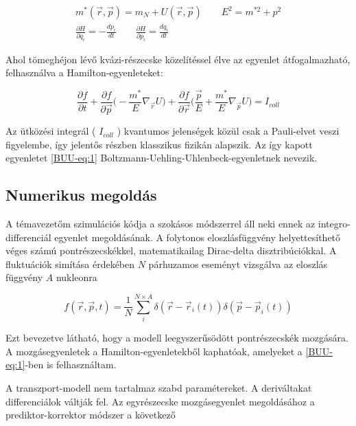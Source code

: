 \documentclass[a4paper,12pt]{article}
\begin{document}
\begin{gather}
	m^{*}(\vec{r}, \vec{p}) = m_{N} + U(\vec{r}, \vec{p}) \quad \quad E^{2} = m^{* 2} + p^{2} \\ 
	\frac{\partial H}{\partial q_{i}} = -\frac{dp_{i}}{dt} \quad \quad \frac{\partial H}{\partial p_{i}} =\frac{dq_{i}}{dt}
\end{gather}
	
\par Ahol tömeghéjon lévő kvázi-részecske közelítéssel élve az egyenlet átfogalmazható, felhasználva a Hamilton-egyenleteket:

\begin{equation} \label{BUU-eq:1}
	\frac{\partial f}{\partial t} + \frac{\partial f}{\partial \vec{p}}\Big(-\frac{m^{*}}{E}\nabla_{\vec{r}}U\Big) + \frac{\partial f}{\partial \vec{r}}\Big(\frac{\vec{p}}{E}+\frac{m^{*}}{E}\nabla_{\vec{p}}U\Big) = I_{coll}
\end{equation}

\par Az ütközési integrál ( $I_{coll}$ ) kvantumos jelenségek közül csak a Pauli-elvet veszi figyelembe, így jelentős részben klasszikus fizikán alapszik. Az így kapott egyenletet \eqref{BUU-eq:1} Boltzmann-Uehling-Uhlenbeck-egyenletnek nevezik.

\subsection{ Numerikus megoldás}

\par A témavezetőm szimulációs kódja a szokásos módszerrel áll neki ennek az integro-differenciál egyenlet megoldásának. A folytonos eloszlásfüggvény helyettesíthető véges számú pontrészecskékkel, matematikailag Dirac-delta disztribúciókkal. A fluktuációk simítása érdekében $N$ párhuzamos eseményt vizsgálva az eloszlás függvény $A$ nukleonra

\begin{equation}
	f(\vec{r}, \vec{p}, t) = \frac{1}{N}\sum_{i}^{N \times A} \delta(\vec{r} - \vec{r}_{i}(t))\delta(\vec{p} - \vec{p}_{i}(t))
\end{equation}

\par Ezt bevezetve látható, hogy a modell leegyszerűsödött pontrészecskék mozgására. A mozgásegyenletek a Hamilton-egyenletekből kaphatóak, amelyeket a \eqref{BUU-eq:1}-ben is felhasználtam.

\par A transzport-modell nem tartalmaz szabd paramétereket. A deriváltakat differenciálok váltják fel. Az egyrészecske mozgásegyenlet megoldásához a prediktor-korrektor módszer a következő
\end{document}
